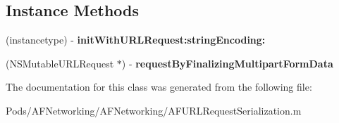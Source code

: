 \subsection*{Instance Methods}
\begin{DoxyCompactItemize}
\item 
\mbox{\label{interface_a_f_streaming_multipart_form_data_ac4f23a0d67cfd8b540f18fe1595303e9}} 
(instancetype) -\/ {\bfseries init\+With\+U\+R\+L\+Request\+:string\+Encoding\+:}
\item 
\mbox{\label{interface_a_f_streaming_multipart_form_data_abbd01865c8d7c04527345d34c08db293}} 
(N\+S\+Mutable\+U\+R\+L\+Request $\ast$) -\/ {\bfseries request\+By\+Finalizing\+Multipart\+Form\+Data}
\end{DoxyCompactItemize}


The documentation for this class was generated from the following file\+:\begin{DoxyCompactItemize}
\item 
Pods/\+A\+F\+Networking/\+A\+F\+Networking/A\+F\+U\+R\+L\+Request\+Serialization.\+m\end{DoxyCompactItemize}
